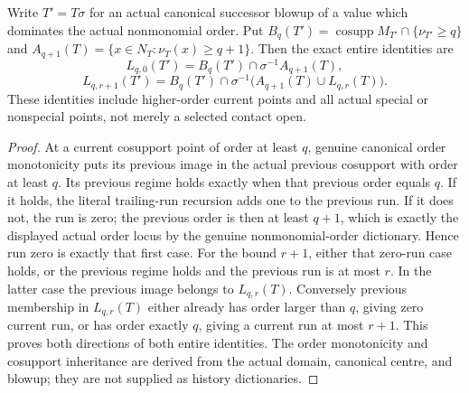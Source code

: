 \begin{lemma}
\label{hir:original-companion-history-year-whole-step-dictionary}
\leanok
{}
Write $T'=T\sigma$ for an actual canonical successor blowup of a value
which dominates the actual nonmonomial order. Put
$B_q(T')=\operatorname{cosupp}M_{T'}\cap\{\nu_{T'}\ge q\}$ and
$A_{q+1}(T)=\{x\in N_T:\nu_T(x)\ge q+1\}$. Then the exact entire identities are
\[
 L_{q,0}(T')=B_q(T')\cap\sigma^{-1}A_{q+1}(T),
\]
\[
 L_{q,r+1}(T')=B_q(T')\cap
       \sigma^{-1}\bigl(A_{q+1}(T)\cup L_{q,r}(T)\bigr).
\]
These identities include higher-order current points and all actual special
or nonspecial points, not merely a selected contact open.
\end{lemma}
\begin{proof}
At a current cosupport point of order at least $q$, genuine canonical
order monotonicity puts its previous image in the actual previous cosupport
with order at least $q$. Its previous regime holds exactly when that
previous order equals $q$. If it holds, the literal trailing-run recursion
adds one to the previous run. If it does not, the run is zero; the previous
order is then at least $q+1$, which is exactly the displayed actual order
locus by the genuine nonmonomial-order dictionary. Hence run zero is
exactly that first case. For the bound $r+1$, either that zero-run case
holds, or the previous regime holds and the previous run is at most $r$.
In the latter case the previous image belongs to $L_{q,r}(T)$.
Conversely previous membership in $L_{q,r}(T)$ either already has order
larger than $q$, giving zero current run, or has order exactly $q$, giving
a current run at most $r+1$. This proves both directions of both entire
identities. The order monotonicity and cosupport inheritance are derived
from the actual domain, canonical centre, and blowup; they are not supplied
as history dictionaries.
\end{proof}

